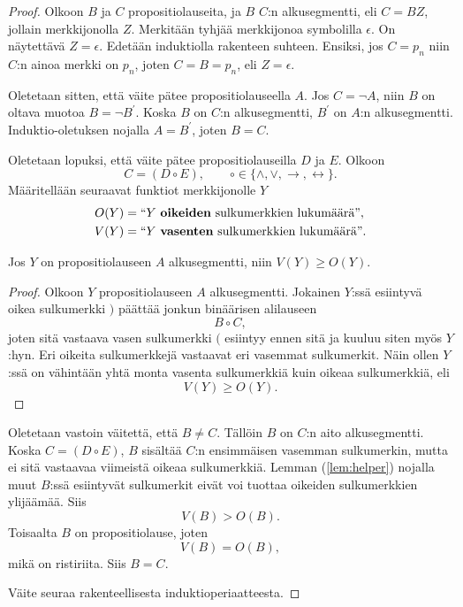 \documentclass[12pt,a4paper]{article}
\begin{document}
\begin{proof}
Olkoon \(B\) ja \(C\) propositiolauseita, ja \(B\) \(C\):n alkusegmentti,
eli \(C = BZ\), jollain merkkijonolla \(Z\). Merkitään tyhjää
merkkijonoa symbolilla \(\epsilon\). On näytettävä \(Z = \epsilon\).
Edetään induktiolla rakenteen suhteen. Ensiksi, jos \(C = p_n\) niin
\(C\):n ainoa merkki on \(p_n\), joten \(C = B = p_n\), eli \(Z = \epsilon\).

Oletetaan sitten, että väite pätee propositiolauseella \(A\). Jos
\(C = \neg A\), niin \(B\) on oltava muotoa \(B = \neg B^{'}\).
Koska \(B\) on \(C\):n alkusegmentti, \(B^{'}\) on \(A\):n alkusegmentti.
Induktio-oletuksen nojalla \(A = B^{'}\), joten \(B = C\).

Oletetaan lopuksi, että väite pätee propositiolauseilla \(D\) ja \(E\). Olkoon
\[
C = (D \circ E), \qquad
\circ \in \{\land, \lor, \rightarrow, \leftrightarrow\}.
\]
Määritellään seuraavat funktiot merkkijonolle \(Y\)
\[
\begin{aligned}
O(Y) &= \text{``\(Y\) \textbf{oikeiden} sulkumerkkien lukumäärä''}, \\
V(Y) &= \text{``\(Y\) \textbf{vasenten} sulkumerkkien lukumäärä''}.
\end{aligned}
\]
\begin{lemma}\label{lem:helper}
Jos \(Y\) on propositiolauseen \(A\) alkusegmentti, niin
\(V(Y) \geq O(Y)\).
\end{lemma}
\begin{proof}
Olkoon \(Y\) propositiolauseen \(A\) alkusegmentti. Jokainen \(Y\):ssä
esiintyvä oikea sulkumerkki \()\) päättää jonkun binäärisen alilauseen
\[B \circ C,\]
joten sitä vastaava vasen sulkumerkki \((\) esiintyy ennen sitä ja kuuluu
siten myös \(Y\):hyn. Eri oikeita sulkumerkkejä vastaavat eri vasemmat
sulkumerkit. Näin ollen \(Y\):ssä on vähintään yhtä monta vasenta
sulkumerkkiä kuin oikeaa sulkumerkkiä, eli
\[V(Y) \geq  O(Y).\]
\end{proof}
Oletetaan vastoin väitettä, että \(B \neq C\). Tällöin \(B\) on
\(C\):n aito alkusegmentti. Koska \(C=(D\circ E)\), \(B\) sisältää
\(C\):n ensimmäisen vasemman sulkumerkin, mutta ei sitä vastaavaa
viimeistä oikeaa sulkumerkkiä. Lemman (\ref{lem:helper}) nojalla muut \(B\):ssä
esiintyvät sulkumerkit eivät voi tuottaa oikeiden sulkumerkkien
ylijäämää. Siis
\[
V(B)>O(B).
\]
Toisaalta \(B\) on propositiolause, joten
\[
V(B)=O(B),
\]
mikä on ristiriita. Siis \(B=C\).

Väite seuraa rakenteellisesta induktioperiaatteesta.
\end{proof}
\end{document}
